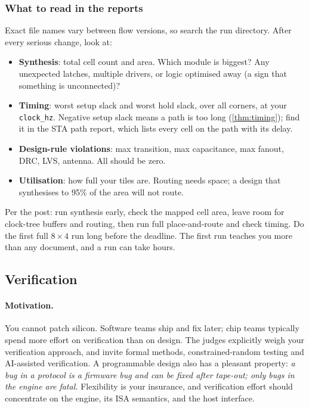 \subsubsection{What to read in the reports}
Exact file names vary between flow versions, so search the run directory.
After every serious change, look at:
\begin{itemize}
  \item \textbf{Synthesis}: total cell count and area. Which module is
    biggest? Any unexpected latches, multiple drivers, or logic optimised
    away (a sign that something is unconnected)?
  \item \textbf{Timing}: worst setup slack and worst hold slack, over all
    corners, at your \texttt{clock\_hz}. Negative setup slack means a path
    is too long (\cref{thm:timing}); find it in the STA path report, which
    lists every cell on the path with its delay.
  \item \textbf{Design-rule violations}: max transition, max capacitance,
    max fanout, DRC, LVS, antenna. All should be zero.
  \item \textbf{Utilisation}: how full your tiles are. Routing needs space;
    a design that synthesises to 95\% of the area will not route.
\end{itemize}
Per the post: run synthesis early, check the mapped cell area, leave room
for clock-tree buffers and routing, then run full place-and-route and check
timing. Do the first full $8\times4$ run long before the deadline. The
first run teaches you more than any document, and a run can take hours.

\subsection{Verification}\label{sec:verif}

\paragraph{Motivation.} You cannot patch silicon. Software teams ship and fix
later; chip teams typically spend more effort on verification than on
design. The judges explicitly weigh your verification approach, and invite
formal methods, constrained-random testing and AI-assisted verification. A
programmable design also has a pleasant property: \emph{a bug in a protocol
is a firmware bug and can be fixed after tape-out; only bugs in the engine
are fatal.} Flexibility is your insurance, and verification effort should
concentrate on the engine, its ISA semantics, and the host interface.

